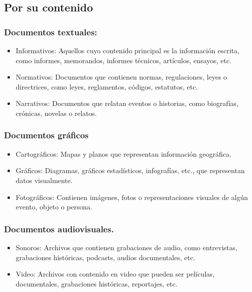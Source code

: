 \documentclass{article}
\begin{document}
\subsection{Por su contenido}

\subsubsection{Documentos textuales:}

\begin{itemize}
    \item   Informativos: Aquellos cuyo contenido principal es la información escrita, como informes, memorandos, informes técnicos, artículos, ensayos, etc.
    \item   Normativos: Documentos que contienen normas, regulaciones, leyes o directrices, como leyes, reglamentos, códigos, estatutos, etc.
    \item   Narrativos: Documentos que relatan eventos o historias, como biografías, crónicas, novelas o relatos.
\end{itemize}

\subsubsection{Documentos gráficos}

\begin{itemize}
    \item   Cartográficos: Mapas y planos que representan información geográfica.
    \item   Gráficos: Diagramas, gráficos estadísticos, infografías, etc., que representan datos visualmente.
    \item   Fotográficos: Contienen imágenes, fotos o representaciones visuales de algún evento, objeto o persona.
\end{itemize}

\subsubsection{Documentos audiovisuales.}

\begin{itemize}
    \item   Sonoros: Archivos que contienen grabaciones de audio, como entrevistas, grabaciones históricas, podcasts, audios documentales, etc.
    \item   Video: Archivos con contenido en video que pueden ser películas, documentales, grabaciones históricas, reportajes, etc.
\end{itemize}
\end{document}
